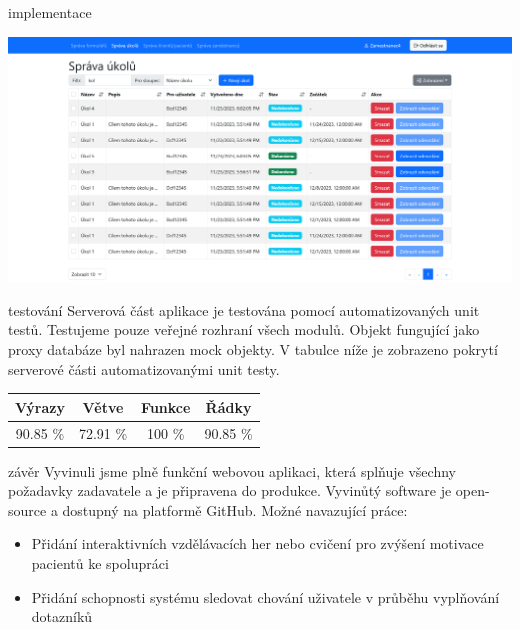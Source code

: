 \documentclass[portrait,a0paper,fontscale=0.25]{baposter}
\begin{document}
\begin{poster}
\begin{posterbox}[column=1, name=impl]{implementace}
            \begin{center}
                \includegraphics[width=\linewidth]{img/sprava-ukolu}
            \end{center}
        \end{posterbox}

        \begin{posterbox}[column=1, name=testing, below=impl]{testování}
            Serverová část aplikace je testována pomocí automatizovaných unit testů.
            Testujeme pouze veřejné rozhraní všech modulů.
            Objekt fungující jako proxy databáze byl nahrazen mock objekty.
            V tabulce níže je zobrazeno pokrytí serverové části automatizovanými unit testy.
            \begin{center}
                \begin{tabular}{c|c|c|c}
                    \textbf{Výrazy} & \textbf{Větve} & \textbf{Funkce} & \textbf{Řádky} \\
                    \hline
                    90.85 \%        & 72.91 \%       & 100 \%          & 90.85 \%       \\
                \end{tabular}
            \end{center}
        \end{posterbox}

        \begin{posterbox}[column=1, name=conclusion, below=testing]{závěr}
            Vyvinuli jsme plně funkční webovou aplikaci, která splňuje všechny požadavky zadavatele a je připravena do produkce.
            Vyvinůtý software je open-source a dostupný na platformě GitHub.
            Možné navazující práce:
            \begin{itemize}
                \item Přidání interaktivních vzdělávacích her nebo cvičení pro zvýšení motivace pacientů ke spolupráci
                \item Přidání schopnosti systému sledovat chování uživatele v průběhu vyplňování dotazníků
            \end{itemize}
        \end{posterbox}


\end{poster}
\end{document}

